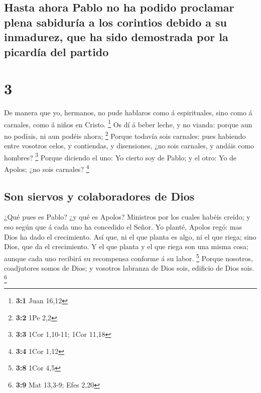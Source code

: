\hypertarget{hasta-ahora-pablo-no-ha-podido-proclamar-plena-sabiduruxeda-a-los-corintios-debido-a-su-inmadurez-que-ha-sido-demostrada-por-la-picarduxeda-del-partido}{%
\subsection{Hasta ahora Pablo no ha podido proclamar plena sabiduría a
los corintios debido a su inmadurez, que ha sido demostrada por la
picardía del
partido}\label{hasta-ahora-pablo-no-ha-podido-proclamar-plena-sabiduruxeda-a-los-corintios-debido-a-su-inmadurez-que-ha-sido-demostrada-por-la-picarduxeda-del-partido}}

\hypertarget{section-2}{%
\section{3}\label{section-2}}

 De manera que yo, hermanos, no pude hablaros como á
espirituales, sino como á carnales, como á niños en Cristo. \footnote{\textbf{3:1}
  Juan 16,12}  Os dí á beber leche, y no vianda: porque aun
no podíais, ni aun podéis ahora; \footnote{\textbf{3:2} 1Pe 2,2}
 Porque todavía sois carnales: pues habiendo entre vosotros
celos, y contiendas, y disensiones, ¿no sois carnales, y andáis como
hombres? \footnote{\textbf{3:3} 1Cor 1,10-11; 1Cor 11,18} 
Porque diciendo el uno: Yo cierto soy de Pablo; y el otro: Yo de Apolos;
¿no sois carnales? \footnote{\textbf{3:4} 1Cor 1,12}

\hypertarget{son-siervos-y-colaboradores-de-dios}{%
\subsection{Son siervos y colaboradores de
Dios}\label{son-siervos-y-colaboradores-de-dios}}

 ¿Qué pues es Pablo? ¿y qué es Apolos? Ministros por los
cuales habéis creído; y eso según que á cada uno ha concedido el Señor.
 Yo planté, Apolos regó: mas Dios ha dado el crecimiento.
 Así que, ni el que planta es algo, ni el que riega; sino
Dios, que da el crecimiento.  Y el que planta y el que riega
son una misma cosa; aunque cada uno recibirá su recompensa conforme á su
labor. \footnote{\textbf{3:8} 1Cor 4,5}  Porque nosotros,
coadjutores somos de Dios; y vosotros labranza de Dios sois, edificio de
Dios sois. \footnote{\textbf{3:9} Mat 13,3-9; Efes 2,20}

